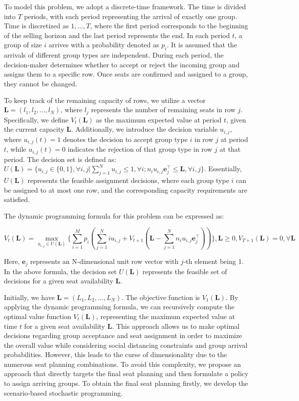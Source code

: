 To model this problem, we adopt a discrete-time framework. The time is divided into $T$ periods, with each period representing the arrival of exactly one group. Time is discretized as $1, \ldots, T$, where the first period corresponds to the beginning of the selling horizon and the last period represents the end. In each period $t$, a group of size $i$ arrives with a probability denoted as $p_i$. It is assumed that the arrivals of different group types are independent. During each period, the decision-maker determines whether to accept or reject the incoming group and assigns them to a specific row. Once seats are confirmed and assigned to a group, they cannot be changed.

To keep track of the remaining capacity of rows, we utilize a vector $\mathbf{L} = (l_1, l_2, \ldots, l_N)$, where $l_j$ represents the number of remaining seats in row $j$. Specifically, we define $V_t(\mathbf{L})$ as the maximum expected value at period $t$, given the current capacity $\mathbf{L}$. Additionally, we introduce the decision variable $u_{i,j}$, where $u_{i,j}(t) = 1$ denotes the decision to accept group type $i$ in row $j$ at period $t$, while $u_{i,j}(t) = 0$ indicates the rejection of that group type in row $j$ at that period. The decision set is defined as: $U(\mathbf{L}) = \{u_{i,j} \in\{0,1\}, \forall i,j| \sum_{j=1}^{N} u_{i,j} \leq 1, \forall i; n_{i}u_{i,j}\mathbf{e}_j^{\top} \leq \mathbf{L}, \forall i,j \}$. Essentially, $U(\mathbf{L})$ represents the feasible assignment decisions, where each group type $i$ can be assigned to at most one row, and the corresponding capacity requirements are satisfied.

The dynamic programming formula for this problem can be expressed as:

$$V_{t}(\mathbf{L}) = \max_{u_{i,j} \in U(\mathbf{L})}\{ \sum_{i=1}^{M} p_i ( \sum_{j=1}^{N} i u_{i,j} + V_{t+1}(\mathbf{L}- \sum_{j=1}^{N} n_i u_{i,j}\mathbf{e}_j^{\top} ))\}, \mathbf{L} \geq 0, V_{T+1}(\mathbf{L}) =0, \forall \mathbf{L}$$

Here, $\mathbf{e}_j$ represents an N-dimensional unit row vector with $j$-th element being 1. In the above formula, the decision set $U(\mathbf{L})$ represents the feasible set of decisions for a given seat availability $\mathbf{L}$. 

Initially, we have $\mathbf{L} = (L_1, L_2, \ldots, L_{N})$. The objective function is $V_1(\mathbf{L})$. By applying the dynamic programming formula, we can recursively compute the optimal value function $V_t(\mathbf{L})$, representing the maximum expected value at time $t$ for a given seat availability $\mathbf{L}$. This approach allows us to make optimal decisions regarding group acceptance and seat assignment in order to maximize the overall value while considering social distancing constraints and group arrival probabilities. However, this leads to the curse of dimensionality due to the numerous seat planning combinations. To avoid this complexity, we propose an approach that directly targets the final seat planning and then formulate a policy to assign arriving groups. To obtain the final seat planning firstly, we develop the scenario-based stochastic programming.


